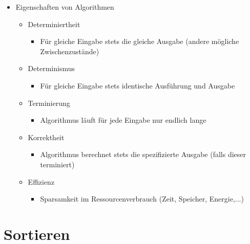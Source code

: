 \begin{itemize}
    \item Eigenschaften von Algorithmen
        \begin{itemize}
	    	\item Determiniertheit
	    		\begin{itemize}
	    			\item Für gleiche Eingabe stets die gleiche Ausgabe (andere mögliche Zwischenzustände)
	    		\end{itemize}
	    	\item Determinismus
	    		\begin{itemize}
	    			\item Für gleiche Eingabe stets identische Ausführung und Ausgabe
	    		\end{itemize}
	    	\item Terminierung
	    		\begin{itemize}
	    			\item Algorithmus läuft für jede Eingabe nur endlich lange
	    		\end{itemize}
	    	\item Korrektheit
	    		\begin{itemize}
	    			\item Algorithmus berechnet stets die spezifizierte Ausgabe (falls dieser terminiert)
	    		\end{itemize}
	    	\item Effizienz
	    		\begin{itemize}
	    			\item Sparsamkeit im Ressourcenverbrauch (Zeit, Speicher, Energie,...)
	    		\end{itemize}
	    \end{itemize}
\end{itemize}

\pagebreak

\section{Sortieren}

